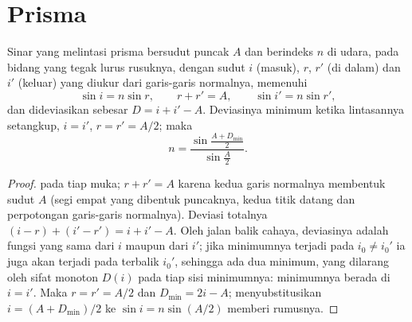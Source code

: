 \section{Prisma}

\begin{proposition}\label{prop:b1:rays-reflection-refraction:prism}
Sinar yang melintasi prisma bersudut puncak $A$ dan berindeks $n$ di
udara, pada bidang yang tegak lurus rusuknya, dengan sudut $i$ (masuk),
$r$, $r'$ (di dalam) dan $i'$ (keluar) yang diukur dari garis-garis
normalnya, memenuhi
\[
\sin i = n \sin r, \qquad r + r' = A, \qquad \sin i' = n \sin r',
\]
dan dideviasikan sebesar $D = i + i' - A$. Deviasinya minimum ketika
lintasannya setangkup, $i = i'$, $r = r' = A/2$; maka
\[
n = \frac{\sin\frac{A + D_{\min}}{2}}{\sin\frac{A}{2}} .
\]
\end{proposition}

\begin{proof}
 pada tiap muka; $r + r' = A$ karena kedua garis normalnya
membentuk sudut $A$ (segi empat yang dibentuk puncaknya, kedua titik
datang dan perpotongan garis-garis normalnya). Deviasi totalnya
$(i - r) + (i' - r') = i + i' - A$. Oleh jalan balik cahaya, deviasinya
adalah fungsi yang sama dari $i$ maupun dari $i'$; jika minimumnya
terjadi pada $i_0 \neq i_0'$ ia juga akan terjadi pada 
terbalik $i_0'$, sehingga ada dua minimum, yang dilarang oleh sifat
monoton $D(i)$ pada tiap sisi minimumnya: minimumnya berada di $i = i'$.
Maka $r = r' = A/2$ dan $D_{\min} = 2i - A$; menyubstitusikan $i = (A +
D_{\min})/2$ ke $\sin i = n\sin(A/2)$ memberi rumusnya.
\end{proof}

